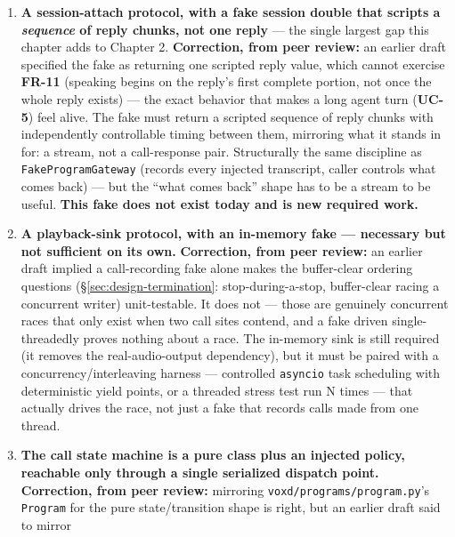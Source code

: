 \documentclass[a4paper,11pt]{report}
\newcommand{\uc}[1]{\textbf{UC-#1}}
\newcommand{\fr}[1]{\textbf{FR-#1}}
\begin{document}
\begin{enumerate}
    provider built against this returns a scripted transcript
    \emph{and} a scripted confidence value without a network call, the
    same way any \texttt{TTSProvider} test substitutes a fake without
    hitting ElevenLabs.
  \item \textbf{A session-attach protocol, with a fake session double
    that scripts a \emph{sequence} of reply chunks, not one reply} ---
    the single largest gap this chapter adds to Chapter 2.
    \textbf{Correction, from peer review:} an earlier draft specified the
    fake as returning one scripted reply value, which cannot exercise
    \fr{11} (speaking begins on the reply's first complete portion, not
    once the whole reply exists) --- the exact behavior that makes a
    long agent turn (\uc{5}) feel alive. The fake must return a scripted
    sequence of reply chunks with independently controllable timing
    between them, mirroring what it stands in for: a stream, not a
    call-response pair. Structurally the same discipline as
    \texttt{FakeProgramGateway} (records every injected transcript,
    caller controls what comes back) --- but the ``what comes back''
    shape has to be a stream to be useful. \textbf{This fake does not
    exist today and is new required work.}
  \item \textbf{A playback-sink protocol, with an in-memory fake ---
    necessary but not sufficient on its own.} \textbf{Correction, from
    peer review:} an earlier draft implied a call-recording fake alone
    makes the buffer-clear ordering questions
    (\S\ref{sec:design-termination}: stop-during-a-stop, buffer-clear
    racing a concurrent writer) unit-testable. It does not --- those are
    genuinely concurrent races that only exist when two call sites
    contend, and a fake driven single-threadedly proves nothing about a
    race. The in-memory sink is still required (it removes the
    real-audio-output dependency), but it must be paired with a
    concurrency/interleaving harness --- controlled \texttt{asyncio} task
    scheduling with deterministic yield points, or a threaded stress
    test run N times --- that actually drives the race, not just a fake
    that records calls made from one thread.
  \item \textbf{The call state machine is a pure class plus an injected
    policy, reachable only through a single serialized dispatch point.}
    \textbf{Correction, from peer review:} mirroring
    \texttt{voxd/programs/program.py}'s \texttt{Program} for the pure
    state/transition shape is right, but an earlier draft said to mirror

\end{enumerate}
\end{document}
